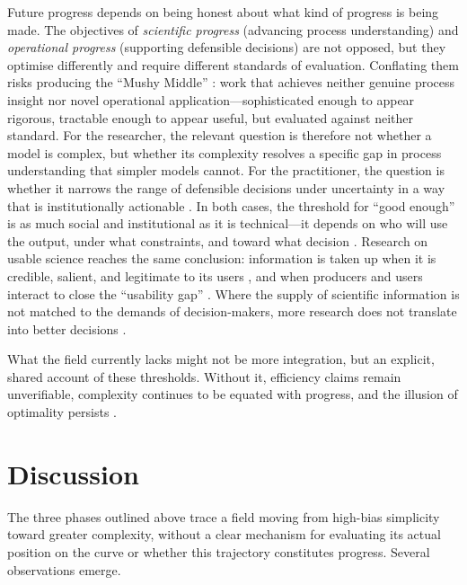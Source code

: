 \documentclass[12pt]{article}
\begin{document}
Future progress depends on being honest about what kind of progress is being made. The objectives of \textit{scientific progress} (advancing process understanding) and \textit{operational progress} (supporting defensible decisions) are not opposed, but they optimise differently and require different standards of evaluation. Conflating them risks producing the ``Mushy Middle'' \citep{stonehouse2007competitive}: work that achieves neither genuine process insight nor novel operational application---sophisticated enough to appear rigorous, tractable enough to appear useful, but evaluated against neither standard. For the researcher, the relevant question is therefore not whether a model is complex, but whether its complexity resolves a specific gap in process understanding that simpler models cannot. For the practitioner, the question is whether it narrows the range of defensible decisions under uncertainty in a way that is institutionally actionable \citep{polese2024multi}. In both cases, the threshold for ``good enough'' is as much social and institutional as it is technical---it depends on who will use the output, under what constraints, and toward what decision \citep{HangerKopp2022, Simon1956}. Research on usable science reaches the same conclusion: information is taken up when it is credible, salient, and legitimate to its users \citep{cash2003knowledge}, and when producers and users interact to close the ``usability gap'' \citep{dilling2011creating, lemos2012narrowing, kirchhoff2013actionable}. Where the supply of scientific information is not matched to the demands of decision-makers, more research does not translate into better decisions \citep{sarewitz2007neglected, weichselgartner2010barriers}.

What the field currently lacks might not be more integration, but an explicit, shared account of these thresholds. Without it, efficiency claims remain unverifiable, complexity continues to be equated with progress, and the illusion of optimality persists \citep{scolobig2017mainstreaming, kalogiannidis2024analyzing}.

\section{Discussion}
\label{sec:discussion}

The three phases outlined above trace a field moving from high-bias simplicity toward greater complexity, without a clear mechanism for evaluating its actual position on the curve or whether this trajectory constitutes progress. Several observations emerge.
\end{document}
